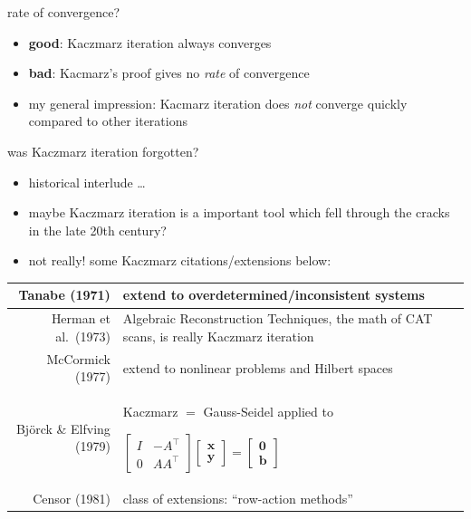 \documentclass[usepdftitle=false,usenames,dvipsnames]{beamer}
\newcommand{\bb}{\mathbf{b}}
\newcommand{\bx}{\mathbf{x}}
\newcommand{\by}{\mathbf{y}}
\newcommand{\bzero}{\bm{0}}
\begin{document}
\begin{frame}{rate of convergence?}

\begin{itemize}
\item \textbf{good}: Kaczmarz iteration always converges
\item \textbf{bad}: Kacmarz's proof gives no \emph{rate} of convergence

\medskip
\item my general impression: Kacmarz iteration does \emph{not} converge quickly compared to other iterations
\end{itemize}
\end{frame}


\begin{frame}{was Kaczmarz iteration forgotten?}

\begin{itemize}
\item historical interlude \dots
\item maybe Kaczmarz iteration is a important tool which fell through the cracks in the late 20th century?
\item not really! some Kaczmarz citations/extensions below:
\end{itemize}

\bigskip
\footnotesize
\begin{tabularx}{1.0\textwidth}{r|X} 
Tanabe (1971) & extend to overdetermined/inconsistent systems \par \\ \hline
Herman et al.~(1973) & Algebraic Reconstruction Techniques, the math of CAT scans, is really Kaczmarz iteration \par \\ \hline
McCormick (1977) & extend to nonlinear problems and Hilbert spaces \par \\ \hline
Bj\"orck \& Elfving (1979) & Kaczmarz $=$ Gauss-Seidel applied to

$\begin{bmatrix} I & - A^\top \\ 0 & A A^\top \end{bmatrix} \begin{bmatrix} \bx \\ \by \end{bmatrix} = \begin{bmatrix} \bzero \\ \bb \end{bmatrix}$ \par \\ \hline
Censor (1981) & class of extensions: ``row-action methods'' \par
\end{tabularx}
\end{frame}
\end{document}
